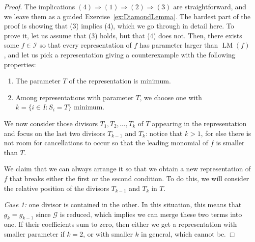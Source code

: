 \documentclass[fleqn, a4paper, twoside]{article}
\newcommand{\leadm}[1]{\operatorname{LM}(#1)}
\newcommand{\0}{\langle 0\rangle}
\newcommand{\II}{\mathcal{I}}
\newcommand{\GG}{\mathcal G}
\newenvironment{tenumerate}{
 \begin{enumerate}
  \setlength{\itemsep}{0pt}
  \setlength{\parskip}{0pt}
}{\end{enumerate}}
\DeclareRobustCommand{\[}{\begin{equation}}%
\DeclareRobustCommand{\]}{\end{equation}}%
\theoremstyle{mytheorem}
\theoremstyle{introthm}
\theoremstyle{mydefinition}
\theoremstyle{mydefinition2}
\theoremstyle{plain} %
\newcommand{\?}{\,?\,}
\theoremstyle{mytheorem}
\theoremstyle{plain} %
\begin{document}
\begin{proof}
The implications $(4)\Longrightarrow (1)\Longrightarrow (2)
\Longrightarrow (3)$ are straightforward, and we leave them
as a guided Exercise~\ref{ex:DiamondLemma}.
The hardest part of the proof is
showing that (3) implies (4), which we go through in
detail here. To prove it, let us assume that (3) holds, but
that (4) does not. Then, there exists some $f\in\II$
so that every representation of $f$ has parameter 
larger than $\leadm{f}$, and let us pick a representation
giving a counterexample with the following properties:
\begin{tenumerate}
\item The parameter $T$ of the representation is minimum.
\item Among representations with parameter $T$, we choose one
with $k=\{ i\in I : S_i=T\}$ minimum.
\end{tenumerate}
We now consider those divisors $T_1,T_2,\ldots,T_k$
of $T$ appearing in the representation and focus on the last two
divisors $T_{k-1}$
and $T_k$: notice that $k>1$, for else there is not room for
cancellations to occur so that the leading monomial of $f$ is smaller than $T$. 

We claim that we can always arrange it so that
we obtain a new representation of $f$ that breaks either
the first or the second condition. To do this, we will consider
the relative position of the divisors $T_{k-1}$ and $T_k$
in $T$.

\emph{Case 1:} one divisor is contained in the other. In this
situation, this means that $g_k = g_{k-1}$ since $\GG$ is
reduced, which implies we can merge these two terms into one.
If their coefficients sum to zero, then either we get a 
representation with smaller parameter if $k=2$, or with
smaller $k$ in general, which cannot be.


\end{proof}
\end{document}
